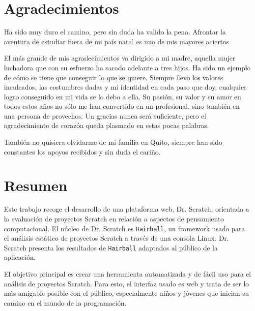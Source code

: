 \documentclass[a4paper, 12pt]{book}
\begin{document}

\chapter*{Agradecimientos}

Ha sido muy duro el camino, pero sin duda ha valido la pena. Afrontar la aventura de
estudiar fuera de mi país natal es uno de mis mayores aciertos

El más grande de mis agradecimientos va dirigido a mi madre, aquella mujer luchadora que
con su esfuerzo ha sacado adelante a tres hijos. Ha sido un ejemplo de cómo se tiene que
conseguir lo que se quiere. Siempre llevo los valores inculcados, las costumbres dadas y
mi identidad en cada paso que doy, cualquier logro conseguido en mi vida se lo debo a ella.
Su pasión, su valor y su amor en todos estos años no sólo me han convertido en un profesional,
sino también en una persona de provechos. Un gracias nunca será suficiente, pero el
agradecimiento de corazón queda plasmado en estas pocas palabras.

También no quisiera olvidarme de mi familia en Quito, siempre han sido constantes los apoyos
recibidos y sin duda el cariño.


\chapter*{Resumen}


Este trabajo recoge el desarrollo de una plataforma web, Dr. Scratch, orientada a la 
evaluación de proyectos Scratch en relación a aspectos de pensamiento computacional. 
El núcleo de Dr. Scratch es \texttt{Hairball}, un framework usado para el análisis estático de 
proyectos Scratch a través de una consola Linux. Dr. Scratch presenta los resultados
de \texttt{Hairball} adaptados al público de la aplicación.

El objetivo principal es crear una herramienta automatizada y de fácil uso para el 
análisis de proyectos Scratch. Para esto, el interfaz usado es web y trata de ser 
lo más amigable posible con el público, especialmente niños y jóvenes que inician
su camino en el mundo de la programación.
\end{document}
